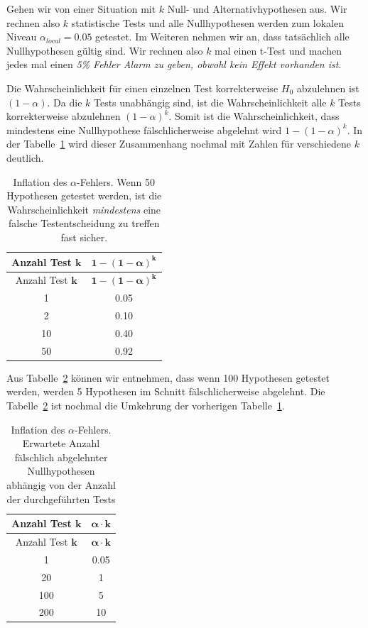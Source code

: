 \documentclass[
  letterpaper,
]{scrbook}
\begin{document}
Gehen wir von einer Situation mit \(k\) Null- und Alternativhypothesen
aus. Wir rechnen also \(k\) statistische Tests und alle Nullhypothesen
werden zum lokalen Niveau \(\alpha_{local} = 0.05\) getestet. Im
Weiteren nehmen wir an, dass tatsächlich alle Nullhypothesen gültig
sind. Wir rechnen also \(k\) mal einen t-Test und machen jedes mal einen
\emph{5\% Fehler Alarm zu geben, obwohl kein Effekt vorhanden ist}.

Die Wahrscheinlichkeit für einen einzelnen Test korrekterweise \(H_0\)
abzulehnen ist \((1 − \alpha)\). Da die \(k\) Tests unabhängig sind, ist
die Wahrscheinlichkeit alle \(k\) Tests korrekterweise abzulehnen
\((1 − \alpha)^k\). Somit ist die Wahrscheinlichkeit, dass mindestens
eine Nullhypothese fälschlicherweise abgelehnt wird \(1-(1-\alpha)^k\).
In der Tabelle~\ref{tbl-mult-alpha} wird dieser Zusammenhang nochmal mit
Zahlen für verschiedene \(k\) deutlich.

\hypertarget{tbl-mult-alpha}{}
\begin{longtable}[]{@{}cc@{}}
\caption{\label{tbl-mult-alpha}Inflation des \(\alpha\)-Fehlers. Wenn 50
Hypothesen getestet werden, ist die Wahrscheinlichkeit \emph{mindestens}
eine falsche Testentscheidung zu treffen fast sicher.}\tabularnewline
\toprule()
Anzahl Test \(\boldsymbol{k}\) & \(\boldsymbol{1-(1-\alpha)^k}\) \\
\midrule()
\endfirsthead
\toprule()
Anzahl Test \(\boldsymbol{k}\) & \(\boldsymbol{1-(1-\alpha)^k}\) \\
\midrule()
\endhead
1 & 0.05 \\
2 & 0.10 \\
10 & 0.40 \\
50 & 0.92 \\
\bottomrule()
\end{longtable}

Aus Tabelle~\ref{tbl-mult-null} können wir entnehmen, dass wenn 100
Hypothesen getestet werden, werden 5 Hypothesen im Schnitt
fälschlicherweise abgelehnt. Die Tabelle~\ref{tbl-mult-null} ist nochmal
die Umkehrung der vorherigen Tabelle~\ref{tbl-mult-alpha}.

\hypertarget{tbl-mult-null}{}
\begin{longtable}[]{@{}cc@{}}
\caption{\label{tbl-mult-null}Inflation des \(\alpha\)-Fehlers.
Erwartete Anzahl fälschlich abgelehnter Nullhypothesen abhängig von der
Anzahl der durchgeführten Tests}\tabularnewline
\toprule()
Anzahl Test \(\boldsymbol{k}\) & \(\boldsymbol{\alpha \cdot k}\) \\
\midrule()
\endfirsthead
\toprule()
Anzahl Test \(\boldsymbol{k}\) & \(\boldsymbol{\alpha \cdot k}\) \\
\midrule()
\endhead
1 & 0.05 \\
20 & 1 \\
100 & 5 \\
200 & 10 \\
\bottomrule()
\end{longtable}
\end{document}

